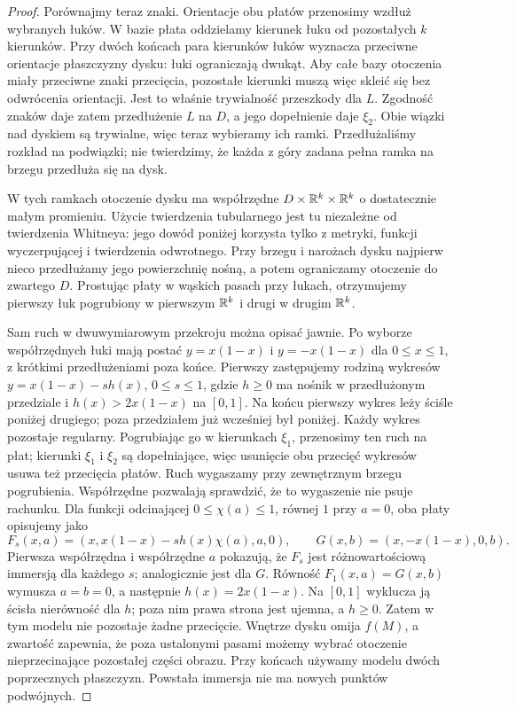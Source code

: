 \begin{proof}
Porównajmy teraz znaki. Orientacje obu płatów
przenosimy wzdłuż wybranych łuków. W bazie płata
oddzielamy kierunek łuku od pozostałych $k$ kierunków.
Przy dwóch końcach para kierunków łuków wyznacza
przeciwne orientacje płaszczyzny dysku: łuki
ograniczają dwukąt. Aby całe bazy otoczenia miały
przeciwne znaki przecięcia, pozostałe kierunki
muszą więc skleić się bez odwrócenia orientacji.
Jest to właśnie trywialność przeszkody dla $L$.
Zgodność znaków daje zatem przedłużenie $L$ na $D$,
a jego dopełnienie daje $\xi_2$. Obie wiązki nad
dyskiem są trywialne, więc teraz wybieramy ich ramki.
Przedłużaliśmy rozkład na podwiązki; nie twierdzimy,
że każda z góry zadana pełna ramka na brzegu
przedłuża się na dysk.

W tych ramkach otoczenie dysku ma współrzędne
$D\times\mathbb{R}^k\times\mathbb{R}^k$ o dostatecznie małym promieniu.
Użycie twierdzenia tubularnego jest tu niezależne
od twierdzenia Whitneya: jego dowód poniżej korzysta
tylko z metryki, funkcji wyczerpującej i twierdzenia
odwrotnego. Przy brzegu i narożach dysku najpierw
nieco przedłużamy jego powierzchnię nośną, a potem
ograniczamy otoczenie do zwartego $D$.
Prostując płaty w wąskich pasach przy łukach,
otrzymujemy pierwszy łuk pogrubiony w pierwszym
$\mathbb{R}^k$ i drugi w drugim $\mathbb{R}^k$.

Sam ruch w dwuwymiarowym przekroju można opisać
jawnie. Po wyborze współrzędnych łuki mają postać
$y=x(1-x)$ i $y=-x(1-x)$ dla $0\leq x\leq1$,
z krótkimi przedłużeniami poza końce. Pierwszy
zastępujemy rodziną wykresów
$y=x(1-x)-s h(x)$, $0\leq s\leq1$, gdzie $h\geq0$
ma nośnik w przedłużonym przedziale i
$h(x)>2x(1-x)$ na $[0,1]$.
Na końcu pierwszy wykres leży ściśle poniżej
drugiego; poza przedziałem już wcześniej był poniżej.
Każdy wykres pozostaje regularny. Pogrubiając go
w kierunkach $\xi_1$, przenosimy ten ruch na płat;
kierunki $\xi_1$ i $\xi_2$ są dopełniające, więc
usunięcie obu przecięć wykresów usuwa też przecięcia
płatów. Ruch wygaszamy przy zewnętrznym brzegu
pogrubienia.
Współrzędne pozwalają sprawdzić, że to wygaszenie
nie psuje rachunku. Dla funkcji odcinającej
$0\leq\chi(a)\leq1$, równej $1$ przy $a=0$,
oba płaty opisujemy jako
\[
 F_s(x,a)=(x,x(1-x)-s h(x)\chi(a),a,0),\qquad
 G(x,b)=(x,-x(1-x),0,b).
\]
Pierwsza współrzędna i współrzędne $a$ pokazują,
że $F_s$ jest różnowartościową immersją dla każdego $s$;
analogicznie jest dla $G$.
Równość $F_1(x,a)=G(x,b)$ wymusza $a=b=0$,
a następnie $h(x)=2x(1-x)$.
Na $[0,1]$ wyklucza ją ścisła nierówność dla $h$;
poza nim prawa strona jest ujemna, a $h\geq0$.
Zatem w tym modelu nie pozostaje żadne przecięcie.
Wnętrze dysku omija $f(M)$, a zwartość
zapewnia, że poza ustalonymi pasami możemy wybrać
otoczenie nieprzecinające pozostałej części obrazu.
Przy końcach używamy modelu dwóch poprzecznych
płaszczyzn. Powstała immersja nie ma nowych
punktów podwójnych.
\end{proof}

